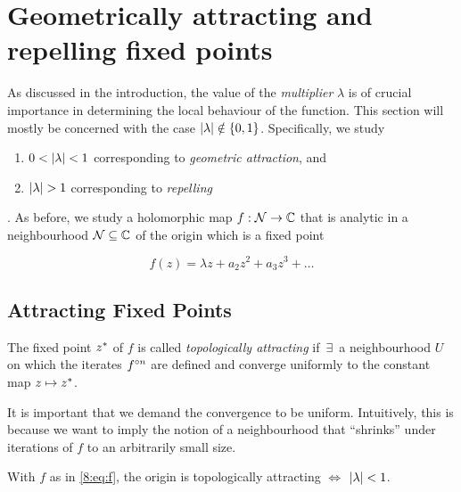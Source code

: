 \documentclass[../main.tex]{subfiles}
\begin{document}
\section{Geometrically attracting and repelling fixed points}
\label{sec:8}

As discussed in the introduction, the value of the \emph{multiplier} $\lambda$ is of crucial importance in determining the local behaviour of the function. This section will mostly be concerned with the case $\left|\lambda\right| \notin \{0, 1\}$. Specifically, we study
\begin{enumerate}
    \item $0<\left|\lambda\right|<1$ corresponding to \emph{geometric attraction}, and
    \item $\abs{\lambda}>1$ corresponding to \emph{repelling}
\end{enumerate}.
As before, we study a holomorphic map $f:\mathcal{N} \to \mathbb{C}$ that is analytic in a neighbourhood $\mathcal{N} \subseteq \mathbb{C}$ of the origin which is a fixed point

\begin{equation}
    \label{8:eq:f}
    f(z)=\lambda z+a_{2} z^{2}+a_{3} z^{3}+\dots
\end{equation}

\subsection{Attracting Fixed Points}
\label{8:sec:att}

\begin{dfn}
    \label{8:def:att}
    The fixed point $z^*$ of $f$ is called \emph{topologically attracting} if\, $\exists$\, a neighbourhood $U$ on which the iterates $f^{\circ n}$ are defined and converge uniformly to the constant map $z \mapsto z^*$.
\end{dfn}

\begin{rmk}
    \label{8:rmk:uniffix}
    It is important that we demand the convergence to be uniform. Intuitively, this is because we want to imply the notion of a neighbourhood that ``shrinks'' under iterations of $f$ to an arbitrarily small size.
\end{rmk}

\begin{lem}
    \label{8:lem:att}
    With $f$ as in \eqref{8:eq:f}, the origin is topologically attracting $\Longleftrightarrow$ $\left|\lambda\right|<1$.
\end{lem}
\end{document}

